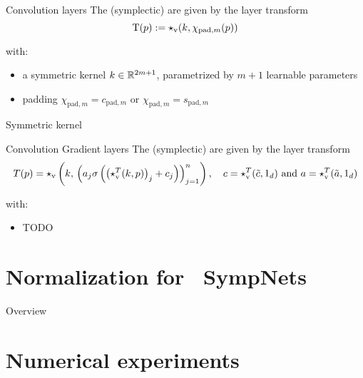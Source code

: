 \begin{frame}[c]{Convolution layers}
  The (symplectic)  are given by the layer transform
  \begin{equation*}
    \mathrm{T}(p) := \star_{\text{v}}(k,\chi_{\text{pad},m}(p))
  \end{equation*}

  with:
  \begin{itemize}
    \item a symmetric kernel $k \in \mathbb{R}^{2m+1}$, 
    parametrized by $m+1$ learnable parameters
    \item padding
    $\chi_{\text{pad},m} = c_{\text{pad},m}$ or $\chi_{\text{pad},m} = s_{\text{pad},m}$
  \end{itemize}
\end{frame}

\begin{frame}{Symmetric kernel}
\end{frame}

\begin{frame}[c]{Convolution Gradient layers}
  The (symplectic)  are given by the layer transform
  \begin{equation*}
    T(p) = \star_{\text{v}} \left( k, \, 
    \left( a_j \sigma \left( \left( \star_{\text{v}}^T(k,p) \right)_j + c_j \right) \right)_{j=1}^n \right),
		\quad c = \star_{\text{v}}^T(\tilde{c},1_d) 
		\text{ and } a = \star_{\text{v}}^T(\tilde{a},1_d)
  \end{equation*}

  with:
  \begin{itemize}
    \item TODO
  \end{itemize}
\end{frame}

\section{Normalization for ~\newline SympNets}

\begin{frame}{Overview}
\end{frame}

\section{Numerical experiments}

